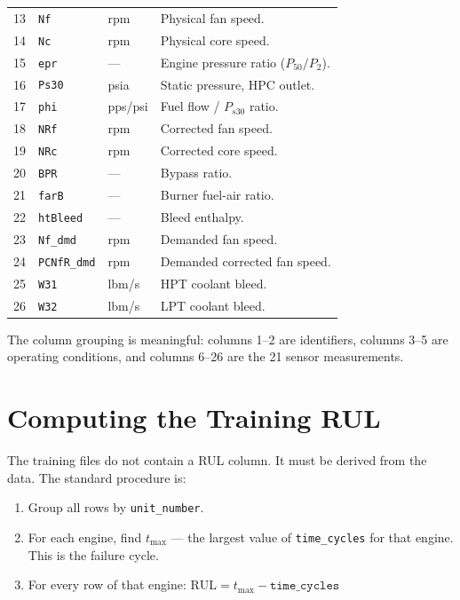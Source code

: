 \documentclass[11pt, a4paper]{article}
\begin{document}
\begin{table}[H]
\begin{tabular}{@{}rllp{6cm}@{}}
    13 & \texttt{Nf}             & rpm     & Physical fan speed. \\
    14 & \texttt{Nc}             & rpm     & Physical core speed. \\
    15 & \texttt{epr}            & ---     & Engine pressure ratio ($P_{50}/P_2$). \\
    16 & \texttt{Ps30}           & psia    & Static pressure, HPC outlet. \\
    17 & \texttt{phi}            & pps/psi & Fuel flow / $P_{s30}$ ratio. \\
    18 & \texttt{NRf}            & rpm     & Corrected fan speed. \\
    19 & \texttt{NRc}            & rpm     & Corrected core speed. \\
    20 & \texttt{BPR}            & ---     & Bypass ratio. \\
    21 & \texttt{farB}           & ---     & Burner fuel-air ratio. \\
    22 & \texttt{htBleed}        & ---     & Bleed enthalpy. \\
    23 & \texttt{Nf\_dmd}        & rpm     & Demanded fan speed. \\
    24 & \texttt{PCNfR\_dmd}     & rpm     & Demanded corrected fan speed. \\
    25 & \texttt{W31}            & lbm/s   & HPT coolant bleed. \\
    26 & \texttt{W32}            & lbm/s   & LPT coolant bleed. \\
    \bottomrule
  \end{tabular}
\end{table}

The column grouping is meaningful: columns 1--2 are
identifiers, columns 3--5 are operating conditions, and
columns 6--26 are the 21 sensor measurements.

\section{Computing the Training RUL}

The training files do not contain a RUL column. It must be
derived from the data. The standard procedure is:

\begin{enumerate}[noitemsep]
  \item Group all rows by \texttt{unit\_number}.
  \item For each engine, find $t_{\max}$ --- the largest
        value of \texttt{time\_cycles} for that engine.
        This is the failure cycle.
  \item For every row of that engine:
        $\text{RUL} = t_{\max} - \texttt{time\_cycles}$
\end{enumerate}
\end{document}

